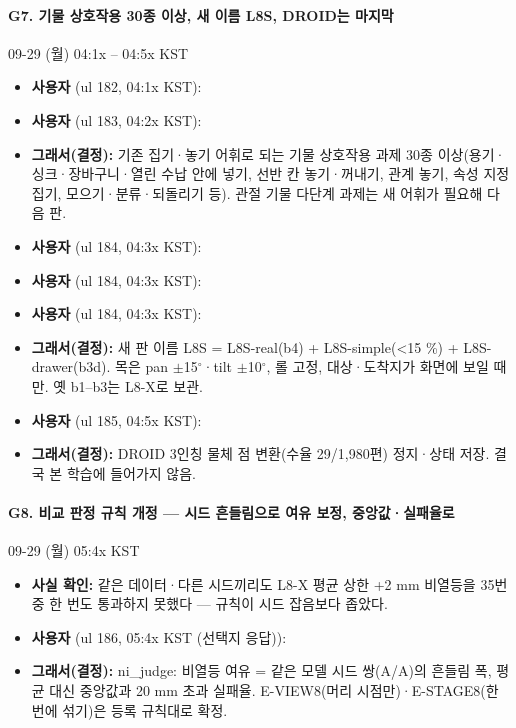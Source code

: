 \paragraph{G7. 기물 상호작용 30종 이상, 새 이름 L8S, DROID는 마지막}
{\small 09-29 (월) 04:1x -- 04:5x KST}
\begin{itemize}
  \item \textbf{사용자} (ul 182, 04:1x KST): 
  \item \textbf{사용자} (ul 183, 04:2x KST): 
  \item \textbf{그래서(결정):} 기존 집기·놓기 어휘로 되는 기물 상호작용 과제 30종 이상(용기·싱크·장바구니·열린 수납 안에 넣기, 선반 칸 놓기·꺼내기, 관계 놓기, 속성 지정 집기, 모으기·분류·되돌리기 등). 관절 기물 다단계 과제는 새 어휘가 필요해 다음 판.
  \item \textbf{사용자} (ul 184, 04:3x KST): 
  \item \textbf{사용자} (ul 184, 04:3x KST): 
  \item \textbf{사용자} (ul 184, 04:3x KST): 
  \item \textbf{그래서(결정):} 새 판 이름 L8S = L8S-real(b4) + L8S-simple(<15 \%) + L8S-drawer(b3d). 목은 pan $\pm$15$^\circ$·tilt $\pm$10$^\circ$, 롤 고정, 대상·도착지가 화면에 보일 때만. 옛 b1--b3는 L8-X로 보관.
  \item \textbf{사용자} (ul 185, 04:5x KST): 
  \item \textbf{그래서(결정):} DROID 3인칭 물체 점 변환(수율 29/1,980편) 정지·상태 저장. 결국 본 학습에 들어가지 않음.
\end{itemize}

\paragraph{G8. 비교 판정 규칙 개정 --- 시드 흔들림으로 여유 보정, 중앙값·실패율로}
{\small 09-29 (월) 05:4x KST}
\begin{itemize}
  \item \textbf{사실 확인:} 같은 데이터·다른 시드끼리도 L8-X 평균 상한 +2 mm 비열등을 35번 중 한 번도 통과하지 못했다 --- 규칙이 시드 잡음보다 좁았다.
  \item \textbf{사용자} (ul 186, 05:4x KST (선택지 응답)): 
  \item \textbf{그래서(결정):} ni\_judge: 비열등 여유 = 같은 모델 시드 쌍(A/A)의 흔들림 폭, 평균 대신 중앙값과 20 mm 초과 실패율. E-VIEW8(머리 시점만)·E-STAGE8(한 번에 섞기)은 등록 규칙대로 확정.
\end{itemize}

